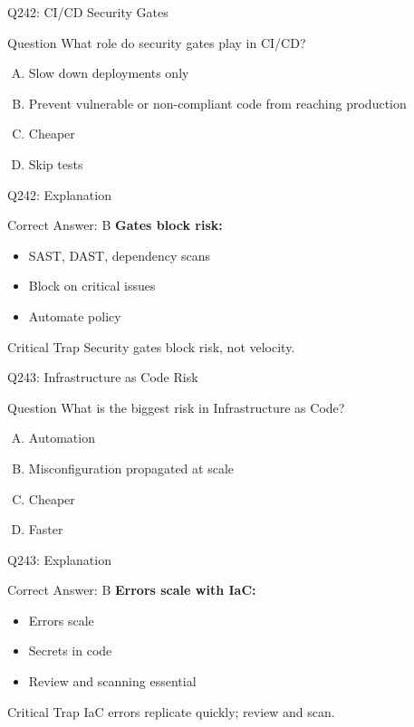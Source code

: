 \documentclass{beamer}
\begin{document}
	\begin{frame}{Q242: CI/CD Security Gates}
		\begin{block}{Question}
			What role do security gates play in CI/CD?
		\end{block}
		\begin{enumerate}[(A)]
			\item Slow down deployments only
			\item Prevent vulnerable or non-compliant code from reaching production
			\item Cheaper
			\item Skip tests
		\end{enumerate}
	\end{frame}
	
	\begin{frame}{Q242: Explanation}
		\begin{block}{Correct Answer: B}
			\textbf{Gates block risk:}
			\begin{itemize}
				\item SAST, DAST, dependency scans
				\item Block on critical issues
				\item Automate policy
			\end{itemize}
		\end{block}
		\begin{alertblock}{Critical Trap}
			Security gates block risk, not velocity.
		\end{alertblock}
	\end{frame}
	
	\begin{frame}{Q243: Infrastructure as Code Risk}
		\begin{block}{Question}
			What is the biggest risk in Infrastructure as Code?
		\end{block}
		\begin{enumerate}[(A)]
			\item Automation
			\item Misconfiguration propagated at scale
			\item Cheaper
			\item Faster
		\end{enumerate}
	\end{frame}
	
	\begin{frame}{Q243: Explanation}
		\begin{block}{Correct Answer: B}
			\textbf{Errors scale with IaC:}
			\begin{itemize}
				\item Errors scale
				\item Secrets in code
				\item Review and scanning essential
			\end{itemize}
		\end{block}
		\begin{alertblock}{Critical Trap}
			IaC errors replicate quickly; review and scan.
		\end{alertblock}
	\end{frame}
	
\end{document}
